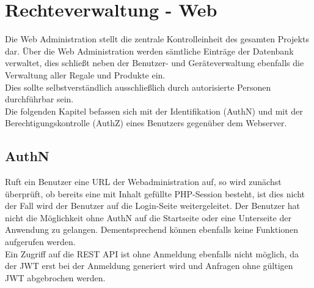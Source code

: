 \chapter{Rechteverwaltung - Web}
\label{cha:rechteverwaltung_web}
Die Web Administration stellt die zentrale Kontrolleinheit des gesamten Projekts dar. Über die Web Administration werden sämtliche Einträge der Datenbank verwaltet, dies schließt neben der Benutzer- und Geräteverwaltung ebenfalls die Verwaltung aller Regale und Produkte ein.\\
Dies sollte selbstverständlich ausschließlich durch autorisierte Personen durchführbar sein.\\

Die folgenden Kapitel befassen sich mit der Identifikation (\acs{AuthN}) und mit der Berechtigungskontrolle (\acs{AuthZ}) eines Benutzers gegenüber dem Webserver.

\section{\acf{AuthN}}
Ruft ein Benutzer eine URL der Webadministration auf, so wird zunächst überprüft, ob bereits eine mit Inhalt gefüllte \ac{PHP}-Session besteht, ist dies nicht der Fall wird der Benutzer auf die Login-Seite weitergeleitet. Der Benutzer hat nicht die Möglichkeit ohne \acl{AuthN} auf die Startseite oder eine Unterseite der Anwendung zu gelangen. Dementsprechend können ebenfalls keine Funktionen aufgerufen werden.\\
Ein Zugriff auf die \ac{REST} \ac{API} ist ohne Anmeldung ebenfalls nicht möglich, da der \ac{JWT} erst bei der Anmeldung generiert wird und Anfragen ohne gültigen \ac{JWT} abgebrochen werden.\\

